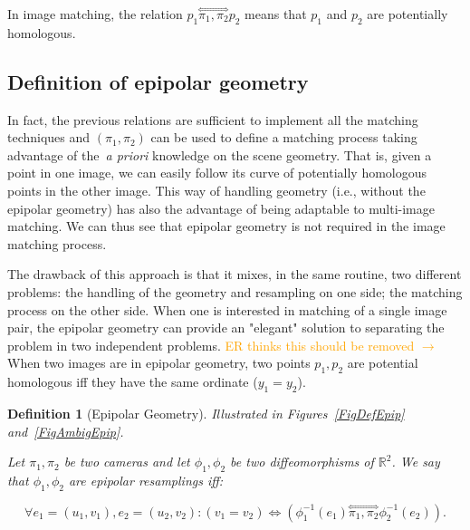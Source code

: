 \documentclass{ipol}
\newcommand{\RR}{\ensuremath{\mathbb{R}}}
\newcommand{\HComp}{\overset{\Longleftrightarrow}{\scriptscriptstyle \pi_1,\pi_2}}
\newtheorem{definition}{Definition}
\newcommand{\er}[1]{\textcolor{orange}{#1}}
\begin{document}
\noindent In image matching, the relation $p_1 \HComp p_2$  means that $p_1$ and $p_2$ are potentially homologous.




\subsection{Definition of epipolar geometry}

In fact, the previous relations are sufficient to implement all the matching techniques and
$(\pi_1,\pi_2)$ can be used to define a matching process taking advantage
of the~\emph{a priori} knowledge on the scene geometry. That is, given a point in one image, we can easily
follow its curve of potentially homologous points in the other image.
This way of handling geometry (i.e., without the epipolar geometry) has also the advantage of being adaptable to multi-image matching. We can thus see that epipolar geometry is not required in the image matching process.

The drawback of this approach is that it mixes, in the same routine, two 
different problems: the handling of the geometry and resampling on one side;
the matching process on the other side. When one is interested
in matching of a single image pair, the epipolar geometry
can provide an "elegant" solution to separating the problem in two independent problems. \er{ER thinks this should be removed $\rightarrow$} When two images are in epipolar geometry, two points $p_1,p_2$ are potential homologous iff they have the same ordinate ($y_1=y_2$).

\begin{definition}[Epipolar Geometry]
\emph{Illustrated in Figures~\ref{FigDefEpip} and~\ref{FigAmbigEpip}.}

Let $\pi_1,\pi_2$ be two cameras and let $\phi_1,\phi_2$  be two diffeomorphisms
of $\RR^2$. We say that $\phi_1,\phi_2$ are epipolar resamplings iff:

\begin{equation}
  \forall e_1=(u_1,v_1) , e_2=(u_2,v_2) : (v_1=v_2)   \Leftrightarrow  (\phi_1^{-1}(e_1) \HComp \phi_2^{-1}(e_2)).
\end{equation}
   \label{EqEpiEgalY}
\end{definition}
\end{document}
